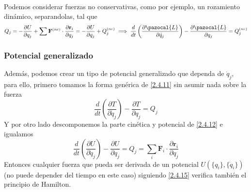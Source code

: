 Podemos considerar fuerzas no conservativas, como por ejemplo, un rozamiento dinámico, separandolas, tal que
\begin{equation} \label{2.4.13}
    Q_j = - \frac{\partial U}{\partial q_j} + \sum \mathbf{F}^{(nc)} \cdot \frac{\partial \mathbf{r}_i}{\partial q_j} = - \frac{\partial U}{\partial q_j} + Q_j^{(nc)} \implies \frac{d}{dt}\left(\frac{\partial \pazocal{L}}{\partial \dot{q}_j}\right)-\frac{\partial \pazocal{L}}{\partial q_j} =  Q_j^{(nc)}
\end{equation} 
\vspace{-20pt}
\subsubsection{Potencial generalizado}
Además, podemos crear un tipo de potencial generalizado que dependa de $\dot{q}_j$, para ello, primero tomamos la forma genérica de \eqref{2.4.11} sin asumir nada sobre la fuerza
\begin{equation} \label{2.4.14}
    \frac{d}{dt}\left(\frac{\partial T}{\partial \dot{q}_j}\right)-\frac{\partial T}{\partial q_j} = Q_j
\end{equation} 
Y por otro lado descomponemos la parte cinética y potencial de \eqref{2.4.12} e igualamos
\begin{equation} \label{2.4.15}
    \frac{d}{dt}\left(\frac{\partial U}{\partial \dot{q}_j}\right)-\frac{\partial U}{\partial q_j} = Q_j = \sum_i \mathbf{F}_i \cdot \frac{\partial \mathbf{r}_i}{\partial q_j}
\end{equation} 
Entonces cualquier fuerza que pueda ser derivada de un potencial $U(\{q_i\},\{\dot{q}_i\})$ (no puede depender del tiempo en este caso) siguiendo \eqref{2.4.15} verifica también el principio de Hamilton.

